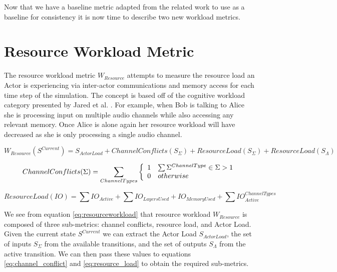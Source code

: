 Now that we have a baseline metric adapted from the related work to use as a baseline for consistency it is now time to describe two new workload metrics.

\section{Resource Workload Metric}

The resource workload metric $W_{Resource}$ attempts to measure the resource load an Actor is experiencing via inter-actor communications and memory access for each time step of the simulation.  The concept is based off of the cognitive workload category presented by Jared et al. \cite{moore2014modeling}.  For example, when Bob is talking to Alice she is processing input on multiple audio channels while also accessing any relevant memory.  Once Alice is alone again her resource workload will have decreased as she is only processing a single audio channel.

\begin{equation}
  W_{Resource}(S^{Current}) = S_{Actor Load} + ChannelConflicts(S_{\Sigma}) + ResourceLoad(S_{\Sigma}) + ResourceLoad(S_{\Lambda})
  \label{eq:resourceworkload}
\end{equation}

\begin{equation}
  ChannelConflicts(\Sigma) = \sum_{ChannelTypes} \left\{
    \begin{array}{l l}
      1 & \sum \Sigma^{ChannelType} \in \Sigma > 1 \\
      0 & otherwise \\
    \end{array}
    \right.
  \label{eq:channel_conflict}
\end{equation}

\begin{equation}
  ResourceLoad(IO) = \sum IO_{Active} + \sum IO_{LayersUsed} + IO_{MemoryUsed} + \sum IO_{Active}^{ChannelTypes}
  \label{eq:resource_load}
\end{equation}

We see from equation \ref{eq:resourceworkload} that resource workload $W_{Resource}$ is composed of three sub-metrics: channel conflicts, resource load, and Actor Load.  Given the current state $S^{Current}$ we can extract the Actor Load $S_{Actor Load}$, the set of inputs $S_{\Sigma}$ from the available transitions, and the set of outputs $S_{\Lambda}$ from the active transition.  We can then pass these values to equations \ref{eq:channel_conflict} and \ref{eq:resource_load} to obtain the required sub-metrics.

